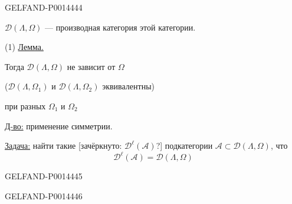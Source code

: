 \begin{GelfandAdjacentEvidence}{GELFAND-P001444}{4}


\(\mathcal D(\Lambda,\Omega)\) — производная категория этой категории.

(1) \uline{Лемма.}

Тогда \(\mathcal D(\Lambda,\Omega)\) не зависит от \(\Omega\)

(\(\mathcal D(\Lambda,\Omega_1)\) и \(\mathcal D(\Lambda,\Omega_2)\) эквивалентны)

при разных \(\Omega_1\) и \(\Omega_2\)

\uline{Д-во:} применение симметрии.

\uline{Задача:} найти такие
[зачёркнуто: \(\mathcal D^{\ell}(\mathcal A)\)?] подкатегории \(\mathcal A\subset\mathcal D(\Lambda,\Omega)\), что
\[
\mathcal D^{\ell}(\mathcal A)=\mathcal D(\Lambda,\Omega)
\]
\end{GelfandAdjacentEvidence}
\begin{GelfandAdjacentEvidence}{GELFAND-P001444}{5}

\end{GelfandAdjacentEvidence}
\begin{GelfandAdjacentEvidence}{GELFAND-P001444}{6}

\end{GelfandAdjacentEvidence}
